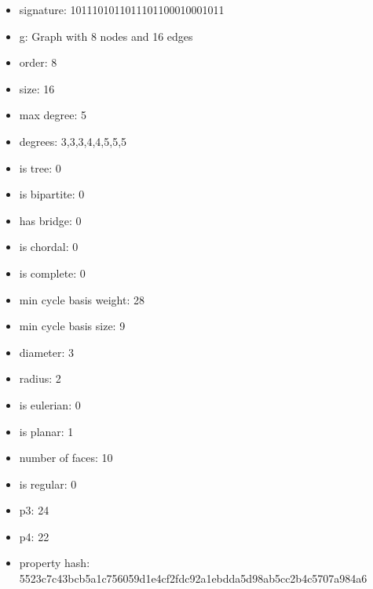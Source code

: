 \begin{itemize}
\item signature: 1011101011011101100010001011
\item g: Graph with 8 nodes and 16 edges
\item order: 8
\item size: 16
\item max degree: 5
\item degrees: 3,3,3,4,4,5,5,5
\item is tree: 0
\item is bipartite: 0
\item has bridge: 0
\item is chordal: 0
\item is complete: 0
\item min cycle basis weight: 28
\item min cycle basis size: 9
\item diameter: 3
\item radius: 2
\item is eulerian: 0
\item is planar: 1
\item number of faces: 10
\item is regular: 0
\item p3: 24
\item p4: 22
\item property hash: 5523c7c43bcb5a1c756059d1e4cf2fdc92a1ebdda5d98ab5cc2b4c5707a984a6
\end{itemize}
\newpage
\begin{figure}
\end{figure}
